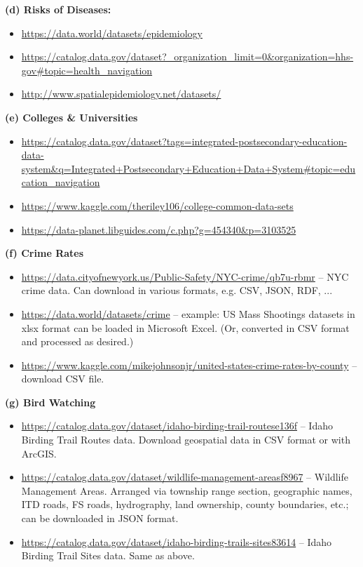 \documentclass{article}[11pt]
\begin{document}
\bigskip
\textbf{(d) Risks of Diseases:}
\begin{itemize}
	\item \url{https://data.world/datasets/epidemiology}
	\item \url{https://catalog.data.gov/dataset?_organization_limit=0&organization=hhs-gov#topic=health_navigation}
	\item \url{http://www.spatialepidemiology.net/datasets/}
\end{itemize}
\bigskip
\textbf{(e) Colleges \& Universities}
\begin{itemize}
	\item \url{https://catalog.data.gov/dataset?tags=integrated-postsecondary-education-data-system&q=Integrated+Postsecondary+Education+Data+System#topic=education_navigation}
	\item \url{https://www.kaggle.com/theriley106/college-common-data-sets}
	\item \url{https://data-planet.libguides.com/c.php?g=454340&p=3103525}
\end{itemize}
\bigskip
\textbf{(f) Crime Rates}
\begin{itemize}
	\item \url{https://data.cityofnewyork.us/Public-Safety/NYC-crime/qb7u-rbmr} – NYC crime data. Can download in various formats, e.g. CSV, JSON, RDF, ...
	\item \url{https://data.world/datasets/crime} – example: US Mass Shootings datasets in xlsx format can be loaded in Microsoft Excel. (Or, converted in CSV format and processed as desired.)
	\item \url{https://www.kaggle.com/mikejohnsonjr/united-states-crime-rates-by-county} – download CSV file.
\end{itemize}
\bigskip
\textbf{(g) Bird Watching}
\begin{itemize}
	\item \url{https://catalog.data.gov/dataset/idaho-birding-trail-routese136f} – Idaho Birding Trail Routes data. Download geospatial data in CSV format or with ArcGIS.
	\item \url{https://catalog.data.gov/dataset/wildlife-management-areasf8967} – Wildlife Management Areas. Arranged via township range section, geographic names, ITD roads, FS roads, hydrography, land ownership, county boundaries, etc.; can be downloaded in JSON format.
	\item \url{https://catalog.data.gov/dataset/idaho-birding-trails-sites83614} – Idaho Birding Trail Sites data. Same as above.
\end{itemize}
\end{document}
